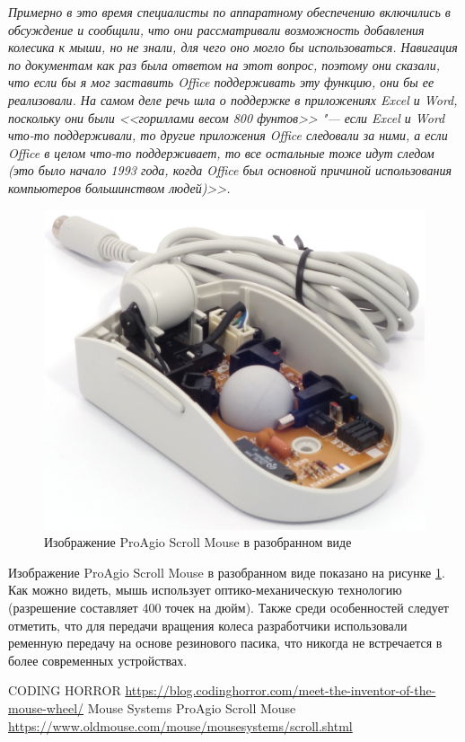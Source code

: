 \documentclass[11pt, a4paper]{article}
\begin{document}
\textit{Примерно в это время специалисты по аппаратному обеспечению включились в обсуждение и сообщили, что они рассматривали возможность добавления колесика к мыши, но не знали, для чего оно могло бы использоваться. Навигация по документам как раз была ответом на этот вопрос, поэтому они сказали, что если бы я мог заставить Office поддерживать эту функцию, они бы ее реализовали. На самом деле речь шла о поддержке в приложениях Excel и Word, поскольку они были <<гориллами весом 800 фунтов>> "--- если Excel и Word что-то поддерживали, то другие приложения Office следовали за ними, а если Office в целом что-то поддерживает, то все остальные тоже идут следом (это было начало 1993 года, когда Office был основной причиной использования компьютеров большинством людей)>>.}

\begin{figure}[h]
    \centering
    \includegraphics[scale=0.8]{1995_pro_agio_scroll_mouse/inside_30.jpg}
    \caption{Изображение ProAgio Scroll Mouse в разобранном виде}
    \label{fig:ScrollInside}
\end{figure}

Изображение ProAgio Scroll Mouse в разобранном виде показано на рисунке \ref{fig:ScrollInside}. Как можно видеть, мышь использует оптико-механическую технологию (разрешение составляет 400 точек на дюйм). Также среди особенностей следует отметить, что для передачи вращения колеса разработчики использовали ременную передачу на основе резинового пасика, что никогда не встречается в более современных устройствах.

\begin{thebibliography}{9}
 CODING HORROR \url{https://blog.codinghorror.com/meet-the-inventor-of-the-mouse-wheel/}
 Mouse Systems ProAgio Scroll Mouse \url{https://www.oldmouse.com/mouse/mousesystems/scroll.shtml}
\end{thebibliography}
\end{document}
